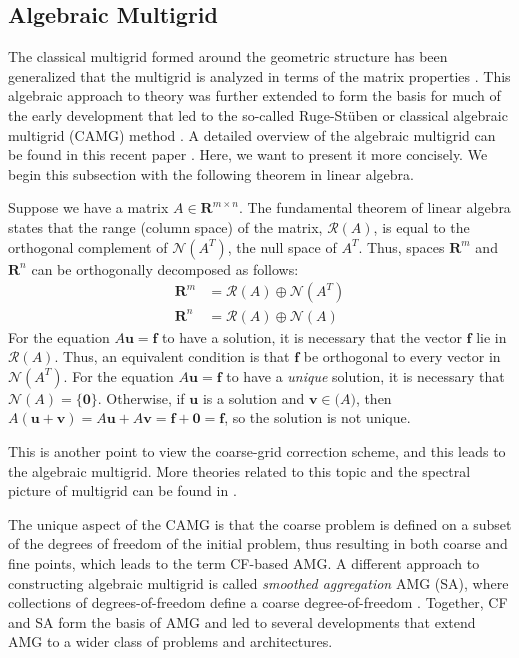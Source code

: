 \subsection{Algebraic Multigrid}
  The classical multigrid formed around the geometric structure has been generalized that the multigrid is analyzed in terms of the matrix properties \cite{mccormick1982multigrid}. This algebraic approach to theory was further extended to form the basis for much of the early development that led to the so-called Ruge-St{\"u}ben or classical algebraic multigrid (CAMG) method \cite{brandt1986algebraic,mandel1988algebraic,ruge1987algebraic}. A detailed overview of the algebraic multigrid can be found in this recent paper \cite{xu2017algebraic}. Here, we want to present it more concisely.
  We begin this subsection with the following theorem in linear algebra.
\begin{theorem}
Suppose we have a matrix $A \in \mathbf{R}^{m\times n}$. The fundamental theorem of linear algebra states that the range (column space) of the matrix, $\mathcal{R}(A)$, is equal to the orthogonal
complement of $\mathcal{N}(A^T)$, the null space of ${A}^{T}$. Thus, spaces $\mathbf{R}^m$ and $\mathbf{R}^n$ can be
orthogonally decomposed as follows:
\begin{align}
    \mathbf{R}^m &= \mathcal{R}(A) \oplus \mathcal{N}(A^T)\\
     \mathbf{R}^n &= \mathcal{R}(A) \oplus \mathcal{N}(A)
\end{align}
For the equation $A\mathbf{u}=\mathbf{f}$ to have a solution, it is necessary that the vector $\mathbf{f}$ lie in $\mathcal{R}(A)$. Thus, an equivalent condition is that $\mathbf{f}$ be orthogonal to every vector in $\mathcal{N}(A^T)$. For the equation $A\mathbf{u}=\mathbf{f}$ to have a \textit{unique} solution, it is necessary that $\mathcal{N}(A) = \{\mathbf{0}\}$. 
Otherwise, if $\mathbf{u}$ is a solution and $\mathbf{v} \in \mathcal(A)$, then $A(\mathbf{u} + \mathbf{v}) = A\mathbf{u} + A\mathbf{v} = \mathbf{f} + \mathbf{0} = \mathbf{f}$, so the solution is not unique\cite{briggs2000multigrid}.
\end{theorem}
This is another point to view the coarse-grid correction scheme, and this leads to the algebraic multigrid. More theories related to this topic and the spectral picture of multigrid can be found in \cite{briggs2000multigrid}.

The unique aspect of the CAMG is that the coarse problem is defined on a subset of the degrees of freedom of the initial problem, thus resulting in both coarse and fine points, which leads to the term CF-based AMG. A different approach to constructing algebraic multigrid is called \textit{smoothed aggregation} AMG (SA), where collections of degrees-of-freedom define a coarse degree-of-freedom \cite{vanvek1996algebraic}. Together, CF and SA form the basis of AMG and led to several developments that extend AMG to a wider class of problems and architectures.

